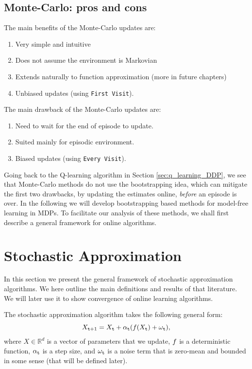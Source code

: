 \subsection{Monte-Carlo: pros and cons}

The main benefits of the Monte-Carlo updates are:
\begin{enumerate}
\item Very simple and intuitive
\item Does not assume the environment is Markovian
\item Extends naturally to function approximation (more in future
chapters)
\item Unbiased updates (using {\tt First Visit}).
\end{enumerate}

\noindent
The main drawback of the Monte-Carlo updates are:
\begin{enumerate}
\item Need to wait for the end of episode to update.
\item Suited mainly for episodic environment.
\item Biased updates (using {\tt Every Visit}).
\end{enumerate}

Going back to the Q-learning algorithm in Section \ref{sec:q_learning_DDP}, we see that Monte-Carlo methods do not use the bootstrapping idea, which can mitigate the first two drawbacks, by updating the estimates online, \textit{before} an episode is over. In the following we will develop bootstrapping based methods for model-free learning in MDPs. To facilitate our analysis of these methods, we shall first describe a general framework for online algorithms.

\section{Stochastic Approximation}
\label{sec:stochastic-approximation}

In this section we present the general framework of stochastic approximation algorithms.
We here outline the main definitions and results of that literature.
We will later use it to show convergence of online learning algorithms.

The stochastic approximation algorithm takes the following general form:
\begin{equation}\label{eq:stochastic_approx}
X_{{\tt t}+1} =
X_{\tt t}+\alpha_{\tt t}(f(X_{\tt t})+\omega_{\tt t}),
\end{equation}
where $X\in \mathbb{R}^d$ is a vector of parameters that we update, $f$ is a deterministic function, $\alpha_{\tt t}$ is a step size, and $\omega_{\tt t}$ is a noise term that is zero-mean and bounded in some sense (that will be defined later).

